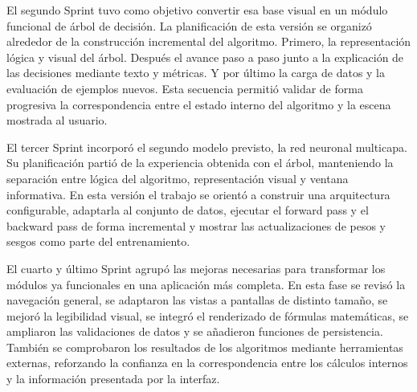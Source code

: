 El segundo Sprint tuvo como objetivo convertir esa base visual en un módulo funcional de árbol de decisión.
La planificación de esta versión se organizó alrededor de la construcción incremental del algoritmo.
Primero, la representación lógica y visual del árbol.
Después el avance paso a paso junto a la explicación de las decisiones mediante texto y métricas.
Y por último la carga de datos y la evaluación de ejemplos nuevos.
Esta secuencia permitió validar de forma progresiva la correspondencia entre el estado interno del algoritmo y la \gls{escena} mostrada al usuario.

El tercer Sprint incorporó el segundo modelo previsto, la red neuronal multicapa.
Su planificación partió de la experiencia obtenida con el árbol, manteniendo la separación entre lógica del algoritmo, representación visual y ventana informativa.
En esta versión el trabajo se orientó a construir una arquitectura configurable, adaptarla al conjunto de datos, ejecutar el forward pass y el backward pass de forma incremental y mostrar las actualizaciones de pesos y sesgos como parte del entrenamiento.

El cuarto y último Sprint agrupó las mejoras necesarias para transformar los módulos ya funcionales en una aplicación más completa.
En esta fase se revisó la navegación general, se adaptaron las vistas a pantallas de distinto tamaño, se mejoró la legibilidad visual, se integró el renderizado de fórmulas matemáticas, se ampliaron las validaciones de datos y se añadieron funciones de persistencia.
También se comprobaron los resultados de los algoritmos mediante herramientas externas, reforzando la confianza en la correspondencia entre los cálculos internos y la información presentada por la interfaz.



